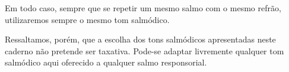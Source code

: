 Em todo caso, sempre que se repetir um mesmo salmo com o mesmo refrão, utilizaremos sempre o mesmo tom salmódico.

Ressaltamos, porém, que a escolha dos tons salmódicos apresentadas neste caderno não pretende ser taxativa. Pode-se adaptar livremente qualquer tom salmódico aqui oferecido a qualquer salmo responsorial.